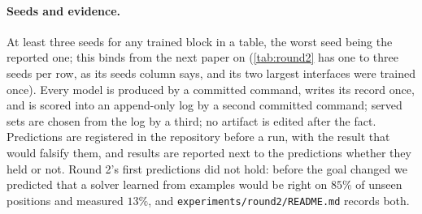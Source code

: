 \paragraph{Seeds and evidence.} At least three seeds for any trained block in a table, the worst seed being the
reported one; this binds from the next paper on (\cref{tab:round2} has one to three seeds per row, as its seeds
column says, and its two largest interfaces were trained once). Every model is produced by a committed command, writes its record once, and is scored into an
append-only log by a second committed command; served sets are chosen from the log by a third; no artifact is
edited after the fact. Predictions are registered in the repository before a run, with the result that would
falsify them, and results are reported next to the predictions whether they held or not. Round 2's first
predictions did not hold: before the goal changed we predicted that a solver learned from examples would be
right on $85\%$ of unseen positions and measured $13\%$, and \texttt{experiments/round2/README.md} records both.
